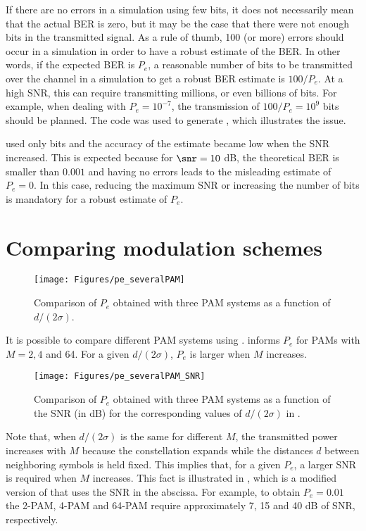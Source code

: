 If there are no errors in a simulation using few bits, it does not necessarily mean that the actual BER is zero, but it may be the case that there were not enough bits in the transmitted
signal. As a rule of thumb, 100 (or more) errors should occur in a simulation in
order to have a robust estimate of the BER. 
In other words, if the expected BER is $P_e$, a reasonable number of bits to be transmitted over the channel in a simulation to get a robust BER estimate is $100/P_e$.
At a high SNR,
this can require transmitting millions, or even billions of bits. For example, when dealing with $P_e = 10^{-7}$, the transmission of $100/P_e=10^9$ bits should be planned. The code  was used to generate , which illustrates the issue.


 used only  bits and the accuracy of the estimate became low when the SNR increased. This is expected because for $\snr=10$ dB, the theoretical BER is smaller than $0.001$ and having no errors leads to the misleading estimate of $P_e = 0$. In this case, reducing the maximum SNR or increasing the number of bits is mandatory for a robust estimate of $P_e$.

\section{Comparing modulation schemes}

\begin{figure}[htbp]
\centering
\texttt{[image: Figures/pe\_severalPAM]}
\caption{Comparison of $P_e$ obtained with three PAM systems as a function of $d/(2\sigma)$.\label{fig:pe_severalPAM}}
\end{figure}

It is possible to compare different PAM systems using .
 informs $P_e$ for PAMs with $M=2,4$ and 64. For a given $d/(2\sigma)$, $P_e$ is larger when $M$ increases. 

\begin{figure}[htbp]
\centering
\texttt{[image: Figures/pe\_severalPAM\_SNR]}
\caption{Comparison of $P_e$ obtained with three PAM systems as a function of the SNR (in dB) for the corresponding values of $d/(2\sigma)$ in .\label{fig:pe_severalPAM_SNR}}
\end{figure}

Note that, when $d/(2\sigma)$ is the same for different $M$, the transmitted power increases with $M$ because the constellation expands while the distances $d$ between neighboring symbols is held fixed. This implies that, for a given $P_e$, a larger SNR is required when $M$ increases. This fact is illustrated in , which is a modified version of  that uses the SNR in the abscissa. For example, to obtain $P_e = 0.01$ the 2-PAM, 4-PAM and 64-PAM require approximately 7, 15 and 40 dB of SNR, respectively.

